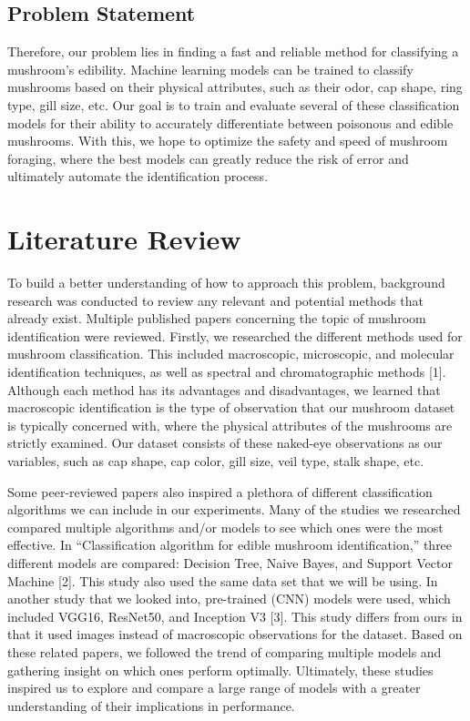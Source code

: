\documentclass[11pt, conference]{IEEEtran}
\begin{document}
    \subsection{Problem Statement}
    Therefore, our problem lies in finding a fast and reliable method for classifying a mushroom's edibility. Machine learning models can be trained to classify mushrooms based on their physical attributes, such as their odor, cap shape, ring type, gill size, etc. Our goal is to train and evaluate several of these classification models for their ability to accurately differentiate between poisonous and edible mushrooms. With this, we hope to optimize the safety and speed of mushroom foraging, where the best models can greatly reduce the risk of error and ultimately automate the identification process.
    
\section{Literature Review}
    To build a better understanding of how to approach this problem, background research was conducted to review any relevant and potential methods that already exist. Multiple published papers concerning the topic of mushroom identification were reviewed. Firstly, we researched the different methods used for mushroom classification. This included macroscopic, microscopic, and molecular identification techniques, as well as spectral and chromatographic methods [1]. Although each method has its advantages and disadvantages, we learned that macroscopic identification is the type of observation that our mushroom dataset is typically concerned with, where the physical attributes of the mushrooms are strictly examined. Our dataset consists of these naked-eye observations as our variables, such as cap shape, cap color, gill size, veil type, stalk shape, etc.
    
    Some peer-reviewed papers also inspired a plethora of different classification algorithms we can include in our experiments. Many of the studies we researched compared multiple algorithms and/or models to see which ones were the most effective. In “Classification algorithm for edible mushroom identification,” three different models are compared: Decision Tree, Naive Bayes, and Support Vector Machine [2]. This study also used the same data set that we will be using. In another study that we looked into, pre-trained (CNN) models were used, which included VGG16, ResNet50, and Inception V3 [3]. This study differs from ours in that it used images instead of macroscopic observations for the dataset. Based on these related papers, we followed the trend of comparing multiple models and gathering insight on which ones perform optimally. Ultimately, these studies inspired us to explore and compare a large range of models with a greater understanding of their implications in performance.
\end{document}
